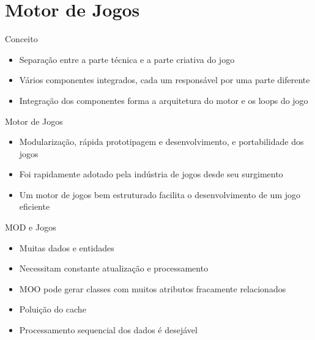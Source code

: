 \documentclass{beamer}
\begin{document}
\section{Motor de Jogos}

\frame{\tableofcontents[currentsection]}

\begin{frame}[t]{Conceito}
    \begin{itemize}
        \item Separação entre a parte técnica e a parte criativa do jogo
        \item Vários componentes integrados, cada um responsável por uma parte diferente
        \item Integração dos componentes forma a arquitetura do motor e os loops do jogo
    \end{itemize}
\end{frame}

\begin{frame}[t]{Motor de Jogos}
    \begin{itemize}
        \item Modularização, rápida prototipagem e desenvolvimento, e portabilidade 
            dos jogos
        \item Foi rapidamente adotado pela indústria de jogos desde seu surgimento
        \item Um motor de jogos bem estruturado facilita o desenvolvimento de um jogo 
            eficiente
    \end{itemize}
\end{frame}

\begin{frame}[t]{MOD e Jogos}
    \begin{itemize}
        \item Muitas dados e entidades
        \item Necessitam constante atualização e processamento
        \item MOO pode gerar classes com muitos atributos fracamente relacionados
        \item Poluição do cache
        \item Processamento sequencial dos dados é desejável
    \end{itemize}
\end{frame}
\end{document}
